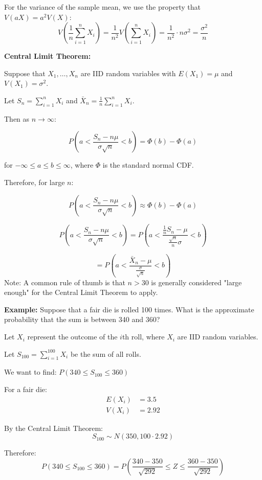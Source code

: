 \documentclass{article}
\begin{document}
    For the variance of the sample mean, we use the property that $V(aX) = a^2V(X)$:
    \[
    V\left(\frac{1}{n}\sum_{i=1}^n X_i\right) = \frac{1}{n^2}V\left(\sum_{i=1}^n X_i\right) = \frac{1}{n^2} \cdot n\sigma^2 = \frac{\sigma^2}{n}
    \]

    \noindent
    \textbf{Central Limit Theorem:}
    
    Suppose that $X_1, \ldots, X_n$ are IID random variables with $E(X_1) = \mu$ and $V(X_1) = \sigma^2$.
    
    Let $S_n = \sum_{i=1}^n X_i$ and $\bar{X}_n = \frac{1}{n}\sum_{i=1}^n X_i$.
    
    Then as $n \to \infty$:
    
    \[
    P\left(a < \frac{S_n - n\mu}{\sigma\sqrt{n}} < b\right) = \Phi(b) - \Phi(a)
    \]
    
    for $-\infty \leq a \leq b \leq \infty$, where $\Phi$ is the standard normal CDF.
    
    Therefore, for large $n$:
    
    \[
    P\left(a < \frac{S_n - n\mu}{\sigma\sqrt{n}} < b\right) \approx \Phi(b) - \Phi(a)
    \]

    \[
        P\left(a < \frac{S_n - n\mu}{\sigma\sqrt{n}} < b\right) = P\left(a < \frac{\frac{1}{n}S_n - \mu}{\frac{\sqrt{n}}{n} \sigma} < b\right)
    \]

    \[
    = P\left(a < \frac{\bar{X}_n - \mu}{\frac{\sigma}{\sqrt{n}}} < b\right)
    \]
    \noindent
    Note: A common rule of thumb is that $n > 30$ is generally considered "large enough" for the Central Limit Theorem to apply.

    \vspace{1em}
    \noindent
    \textbf{Example:} Suppose that a fair die is rolled 100 times. What is the approximate probability that the sum is between 340 and 360?

    Let $X_i$ represent the outcome of the $i$th roll, where $X_i$ are IID random variables.

    Let $S_{100} = \sum_{i=1}^{100} X_i$ be the sum of all rolls.

    We want to find: $P(340 \leq S_{100} \leq 360)$

    For a fair die:
    \begin{align*}
        E(X_i) &= 3.5 \\
        V(X_i) &= 2.92
    \end{align*}

    By the Central Limit Theorem:
    \[S_{100} \sim N(350, 100 \cdot 2.92)\]

    Therefore:
    \[P(340 \leq S_{100} \leq 360) = P\left(\frac{340 - 350}{\sqrt{292}} \leq Z \leq \frac{360 - 350}{\sqrt{292}}\right)\]




























    
\end{document}
